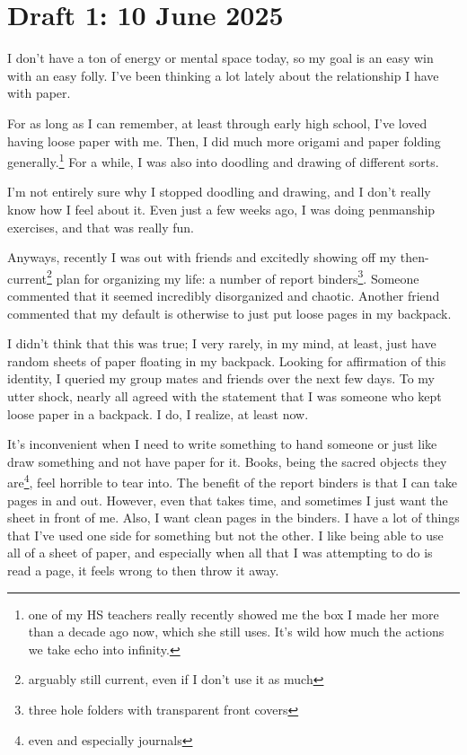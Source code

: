\documentclass[12pt]{article}
\renewcommand{\,}{\textsuperscript{,}}
\begin{document}
\section{Draft 1: 10 June 2025}

I don't have a ton of energy or mental space today, so my goal is an easy win with an easy folly.  
I've been thinking a lot lately about the relationship I have with paper.

For as long as I can remember, at least through early high school, I've loved having loose paper with me.  
Then, I did much more origami and paper folding generally.\footnote{one of my HS teachers really recently showed me the box I made her more than a decade ago now, which she still uses.  
It's wild how much the actions we take echo into infinity.}  
For a while, I was also into doodling and drawing of different sorts.

I'm not entirely sure why I stopped doodling and drawing, and I don't really know how I feel about it.  
Even just a few weeks ago, I was doing penmanship exercises, and that was really fun.

Anyways, recently I was out with friends and excitedly showing off my then-current\footnote{arguably still current, even if I don't use it as much} plan for organizing my life: a number of report binders\footnote{three hole folders with transparent front covers}.  
Someone commented that it seemed incredibly disorganized and chaotic.  
Another friend commented that my default is otherwise to just put loose pages in my backpack.

I didn't think that this was true; I very rarely, in my mind, at least, just have random sheets of paper floating in my backpack.  
Looking for affirmation of this identity, I queried my group mates and friends over the next few days.  
To my utter shock, nearly all agreed with the statement that I was someone who kept loose paper in a backpack.  
I do, I realize, at least now.

It's inconvenient when I need to write something to hand someone or just like draw something and not have paper for it.  
Books, being the sacred objects they are\footnote{even and especially journals}, feel horrible to tear into.  
The benefit of the report binders is that I can take pages in and out.  
However, even that takes time, and sometimes I just want the sheet in front of me.  
Also, I want clean pages in the binders.  
I have a lot of things that I've used one side for something but not the other.  
I like being able to use all of a sheet of paper, and especially when all that I was attempting to do is read a page, it feels wrong to then throw it away.
\end{document}
